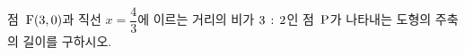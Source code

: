 점~$\mathrm{F}(3{,}\mkern3mu\mathopen{}0)$과 직선 $x=\dfrac{4}{3}$에 이르는 거리의 비가 $3\mkern3mu :\mkern3mu 2$인 점~$\mathrm{P}$가 나타내는 도형의 주축의 길이를 구하시오.
